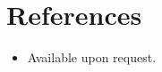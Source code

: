 \documentclass[10pt]{article}
\begin{document}
\section{References}
\begin{itemize}
\item Available upon request.
\end{itemize}
% 
%  
\end{document}
